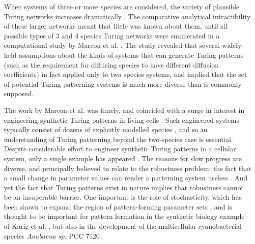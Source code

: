 When systems of three or more species are considered, the variety of plausible Turing networks increases dramatically \cite{klika2012influence,marcon2016high}. The comparative analytical intractibility of these larger networks meant that little was known about them, until all possible types of 3 and 4 species Turing networks were enumerated in a computational study by Marcon et al. \cite{marcon2016high}. The study revealed that several widely-held assumptions about the kinds of systems that can generate Turing patterns (such as the requirement for diffusing species to have different diffusion coefficients) in fact applied only to two species systems, and implied that the set of potential Turing patterning systems is much more diverse than is commonly supposed.

The work by Marcon et al. was timely, and coincided with a surge in interest in engineering synthetic Turing patterns in living cells \cite{diambra2014cooperativity,borek2016turing,scholes2017three,Karig2018}. 
Such engineered systems typically consist of dozens of explicitly modelled species \cite{smith2018model}, and so an understanding of Turing patterning beyond the two-species case is essential. 
Despite considerable effort to engineer synthetic Turing patterns in a cellular system, only a single example has appeared \cite{Karig2018}. 
The reasons for slow progress are diverse, and principally believed to relate to the robustness problem: the fact that a small change in parameter values can render a patterning system useless \cite{crampin1999reaction,maini2012turing,Scholes2018}. 
And yet the fact that Turing patterns exist in nature implies that robustness cannot be an insuperable barrier.
One important is the role of stochasticity, which has been shown to expand the region of pattern-forming parameter sets \cite{biancalani2010stochastic,butler2011fluctuation}, and is thought to be important for pattern formation in the synthetic biology example of Karig et al. \cite{Karig2018}, but also in the development of the multicellular cyanobacterial species \emph{Anabaena sp.} PCC 7120 \cite{dipatti2018robust}.

